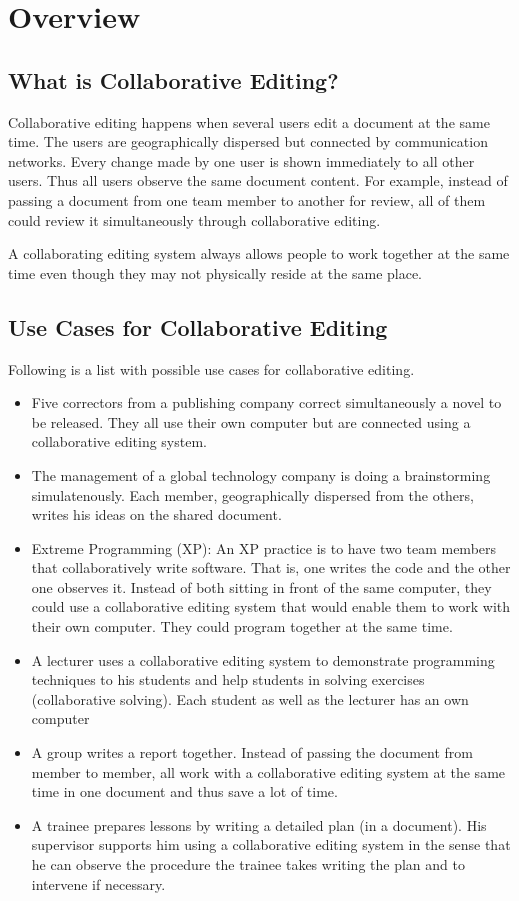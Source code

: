 \chapter{Overview}
\label{chapter:overview}



\section{What is Collaborative Editing?}
Collaborative editing happens when several users edit a document at the same time. The users are geographically dispersed but connected by communication networks. Every change made by one user is shown immediately to all other users. Thus all users observe the same document content. For example, instead of passing a document from one team member to another for review, all of  them could review it simultaneously through collaborative editing.

A collaborating editing system always allows people to work together at the same time even though they may not physically reside at the same place.



\section{Use Cases for Collaborative Editing}
Following is a list with possible use cases for collaborative editing.

\begin{itemize}
\item Five correctors from a publishing company correct simultaneously a novel to be released. They all use their own computer but are connected using a collaborative editing system.
\item The management of a global technology company is doing a brainstorming simulatenously. Each member, geographically dispersed from the others, writes his ideas on the shared document.
\item Extreme Programming (XP): An XP practice is to have two team members that collaboratively write software. That is, one writes the code and the other one observes it. Instead of both sitting in front of the same computer, they could use a collaborative editing system that would enable them to work with their own computer. They could program together at the same time.
\item A lecturer uses a collaborative editing system to demonstrate programming techniques to his students and help students in solving exercises (collaborative solving). Each student as well as the lecturer has an own computer
\item A group writes a report together. Instead of passing the document from member to member, all work with a collaborative editing system at the same time in one document and thus save a lot of time.
\item A trainee prepares lessons by writing a detailed plan (in a document). His supervisor supports him using a collaborative editing system in the sense that he can observe the procedure the trainee takes writing the plan and to intervene if necessary.
\end{itemize}



